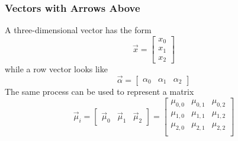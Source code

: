 \subsubsection{Vectors with Arrows Above}
    A three-dimensional vector has the form
    \begin{equation}
        \vec{x}
            =\begin{bmatrix}
                x_0 \\ x_1 \\ x_2
             \end{bmatrix}
    \end{equation}
    while a row vector looks like
    \begin{equation}
        \vec{\alpha}
            =\begin{bmatrix}
                \alpha_0 & \alpha_1 & \alpha_2
             \end{bmatrix}
    \end{equation}
    The same process can be used to represent a matrix
    \begin{equation}
        \vec{\mu}_i
            =\begin{bmatrix}
                \vec{\mu}_0 & \vec{\mu}_1 & \vec{\mu}_{2}
             \end{bmatrix}
            =\begin{bmatrix}
                \mu_{0,0} & \mu_{0,1} & \mu_{0,2} \\
                \mu_{1,0} & \mu_{1,1} & \mu_{1,2} \\
                \mu_{2,0} & \mu_{2,1} & \mu_{2,2} \\
             \end{bmatrix}
    \end{equation}

